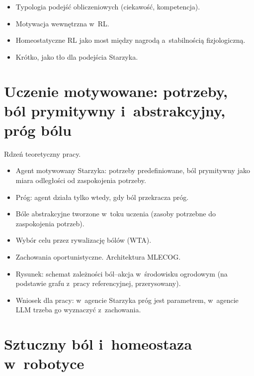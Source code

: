 \begin{planroboczy}[ok. 1,5 s.]
\begin{itemize}
  \item Typologia podejść obliczeniowych (ciekawość, kompetencja).
  \item Motywacja wewnętrzna w~RL.
  \item Homeostatyczne RL jako most między nagrodą a~stabilnością fizjologiczną.
  \item Krótko, jako tło dla podejścia Starzyka.
\end{itemize}

\end{planroboczy}

\section{Uczenie motywowane: potrzeby, ból prymitywny i~abstrakcyjny, próg bólu}
\label{sec:1-4}

\begin{planroboczy}[ok. 3 s.]
Rdzeń teoretyczny pracy.
\begin{itemize}
  \item Agent motywowany Starzyka: potrzeby predefiniowane, ból prymitywny jako miara odległości od zaspokojenia potrzeby.
  \item Próg: agent działa tylko wtedy, gdy ból przekracza próg.
  \item Bóle abstrakcyjne tworzone w~toku uczenia (zasoby potrzebne do zaspokojenia potrzeb).
  \item Wybór celu przez rywalizację bólów (WTA).
  \item Zachowania oportunistyczne. Architektura MLECOG.
  \item Rysunek: schemat zależności ból–akcja w~środowisku ogrodowym (na podstawie grafu z~pracy referencyjnej, przerysowany).
  \item Wniosek dla pracy: w~agencie Starzyka próg jest parametrem, w~agencie LLM trzeba go wyznaczyć z~zachowania.
\end{itemize}

\end{planroboczy}

\section{Sztuczny ból i~homeostaza w~robotyce}
\label{sec:1-5}

